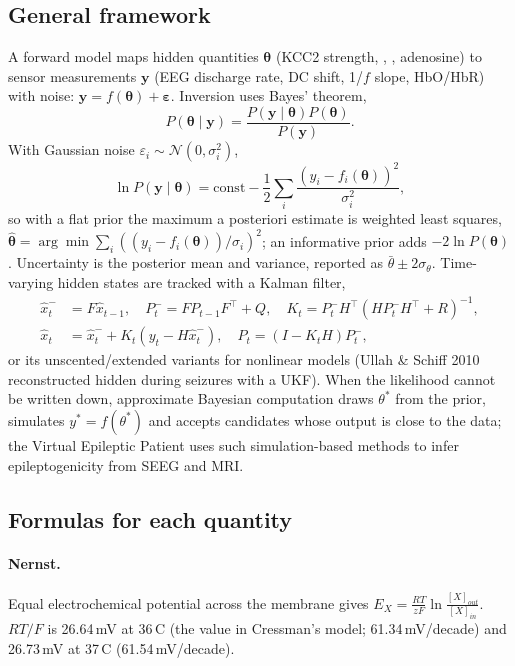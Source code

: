 \subsection{General framework}

A forward model maps hidden quantities $\boldsymbol\theta$ (KCC2 strength, \Cli, \Ko, adenosine) to sensor measurements $\mathbf y$ (EEG discharge rate, DC shift, 1/$f$ slope, HbO/HbR) with noise: $\mathbf y = f(\boldsymbol\theta)+\boldsymbol\varepsilon$. Inversion uses Bayes' theorem,
\begin{equation}
P(\boldsymbol\theta\mid\mathbf y) = \frac{P(\mathbf y\mid\boldsymbol\theta)P(\boldsymbol\theta)}{P(\mathbf y)}.
\end{equation}
With Gaussian noise $\varepsilon_i\sim\mathcal N(0,\sigma_i^2)$,
\begin{equation}
\ln P(\mathbf y\mid\boldsymbol\theta) = \mathrm{const} - \frac12\sum_i\frac{(y_i-f_i(\boldsymbol\theta))^2}{\sigma_i^2},
\end{equation}
so with a flat prior the maximum a posteriori estimate is weighted least squares, $\hat{\boldsymbol\theta} = \arg\min\sum_i((y_i-f_i(\boldsymbol\theta))/\sigma_i)^2$; an informative prior adds $-2\ln P(\boldsymbol\theta)$. Uncertainty is the posterior mean and variance, reported as $\bar\theta\pm2\sigma_\theta$. Time-varying hidden states are tracked with a Kalman filter,
\begin{align}
\hat x_t^- &= F\hat x_{t-1},\quad P_t^- = FP_{t-1}F^\top + Q,\quad K_t = P_t^-H^\top(HP_t^-H^\top+R)^{-1},\\
\hat x_t &= \hat x_t^- + K_t(y_t - H\hat x_t^-),\quad P_t = (I-K_tH)P_t^-,
\end{align}
or its unscented/extended variants for nonlinear models (Ullah \& Schiff 2010 reconstructed hidden \Ko{} during seizures with a UKF). When the likelihood cannot be written down, approximate Bayesian computation draws $\theta^*$ from the prior, simulates $y^*=f(\theta^*)$ and accepts candidates whose output is close to the data; the Virtual Epileptic Patient uses such simulation-based methods to infer epileptogenicity from SEEG and MRI.

\subsection{Formulas for each quantity}

\paragraph{Nernst.} Equal electrochemical potential across the membrane gives $E_X = \frac{RT}{zF}\ln\frac{[X]_{out}}{[X]_{in}}$. $RT/F$ is 26.64\,mV at 36\,\textdegree C (the value in Cressman's model; 61.34\,mV/decade) and 26.73\,mV at 37\,\textdegree C (61.54\,mV/decade).


